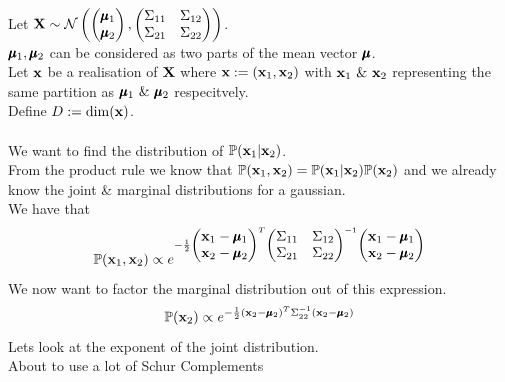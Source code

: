 \documentclass[11pt,a4paper]{article}
\begin{document}
\\Let $\textbf{X}\sim\mathcal{N}\left(\begin{pmatrix}
\pmb{\mu}_1\\\pmb{\mu}_2
\end{pmatrix},\begin{pmatrix}
\Sigma_{11}&\Sigma_{12}\\
\Sigma_{21}&\Sigma_{22}
\end{pmatrix}\right)$.\\
$\pmb{\mu}_1,\pmb{\mu}_2$ can be considered as two parts of the mean vector $\pmb{\mu}$.\\
Let $\textbf{x}$ be a realisation of $\textbf{X}$ where $\textbf{x}:=(\textbf{x}_1,\textbf{x}_2)$ with $\textbf{x}_1\ \&\ \textbf{x}_2$ representing the same partition as $\pmb{\mu}_1\ \&\ \pmb{\mu}_2$ respecitvely.\\
Define $D:=\mathrm{dim}(\textbf{x})$.\\
\\We want to find the distribution of $\mathbb{P}(\textbf{x}_1|\textbf{x}_2)$.\\
From the product rule we know that $\mathbb{P}(\textbf{x}_1,\textbf{x}_2)=\mathbb{P}(\textbf{x}_1|\textbf{x}_2)\mathbb{P}(\textbf{x}_2)$ and we already know the joint \& marginal distributions for a gaussian.\\
We have that
$$
\mathbb{P}(\textbf{x}_1,\textbf{x}_2)\propto e^{-\frac{1}{2}\begin{pmatrix}
\textbf{x}_1-\pmb{\mu}_1\\\textbf{x}_2-\pmb{\mu}_2
\end{pmatrix}^T\begin{pmatrix}
\Sigma_{11}&\Sigma_{12}\\
\Sigma_{21}&\Sigma_{22}
\end{pmatrix}^{-1}\begin{pmatrix}
\textbf{x}_1-\pmb{\mu}_1\\\textbf{x}_2-\pmb{\mu}_2
\end{pmatrix}}$$
We now want to factor the marginal distribution out of this expression.
$$
\mathbb{P}(\textbf{x}_2)\propto e^{-\frac{1}{2}(\textbf{x}_2-\pmb{\mu}_2)^T\Sigma_{22}^{-1}(\textbf{x}_2-\pmb{\mu}_2)}
$$
Lets look at the exponent of the joint distribution.\\
\nb About to use a lot of Schur Complements
\end{document}
